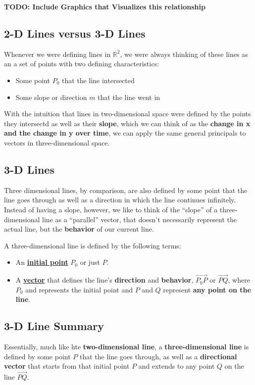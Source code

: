 \documentclass{report}
\newcommand{\R}{\mathbb{R}}
\begin{document}
\begin{sloppypar}
\begin{itemize}
        \textbf{TODO: Include Graphics that Visualizes
        this relationship}

\end{itemize}

\subsection{2-D Lines versus 3-D Lines}
Whenever we were defining lines in $ \R^{2}$, we
were always thinking of these lines as an
a set of points with two defining characteristics:
\begin{itemize}
  \item Some point $ P_{0} $ that the line
        intersected
  \item Some slope or direction $ m $ that the
        line went in
\end{itemize}

With the intuition that lines in two-dimensional space
were defined by the points they intersectd as well
as their \textbf{slope}, which we can think of as
the \textbf{change in x and the change in y over time},
we can apply the same general principals to vectors in
three-dimensional space.
\subsection{3-D Lines}
Three dimensional lines, by comparison, are also
defined by some point that the line goes through
as well as a direction in which the line continues
infinitely. Instead of having a slope, however,
we like to think of the ``slope'' of a three-dimensional
line as a ``parallel'' vector, that doesn't necessarily
represent the actual line, but the \textbf{behavior}
of our current line.
\par A three-dimensional line is defined by the following
terms:
\begin{itemize}
  \item An \underline{\textbf{initial point}} $ P_{0} $ or
        just $ P $.
  \item A \underline{\textbf{vector}} that defines
        the line's \textbf{direction} and \textbf{behavior},
        $ \overrightarrow{P_{0}P} $ or $ \overrightarrow{PQ}$, where $ P_{0} $ and
        represents the initial point and $ P $ and $ Q $
        represent \textbf{any point on the line}.

\end{itemize}
\subsection{3-D Line Summary}
Essentially, much like hte \textbf{two-dimensional line},
a \textbf{three-dimensional line} is defined by some
point $ P $ that the line goes through, as well as
a \textbf{directional vector} that starts from that
initial point $ P $ and extends to any point $ Q $ on
the line $ \overrightarrow{PQ} $.




\end{sloppypar}
\end{document}
